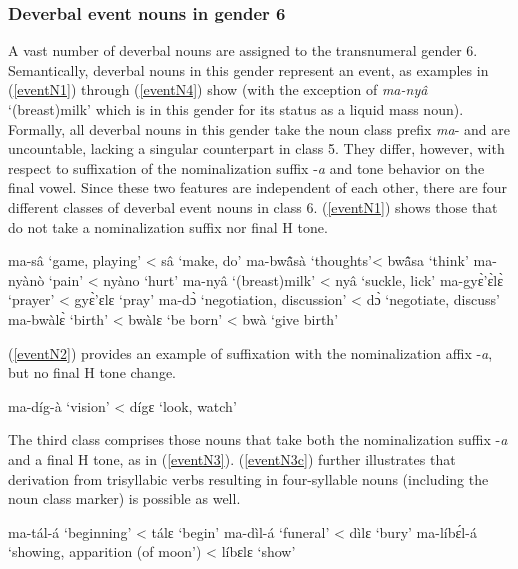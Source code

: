 \subsubsection{Deverbal event nouns in gender 6}
\label{sec:NOM6}

A vast number of deverbal nouns are assigned to the transnumeral gender 6. Semantically, deverbal nouns in this gender represent an event, as  examples in (\ref{eventN1}) through (\ref{eventN4}) show (with the exception of  {\itshape ma-nyâ} `(breast)milk' which is in this gender for its status as a liquid mass noun). 
Formally, all deverbal nouns in this gender take the noun class prefix {\itshape ma}- and are uncountable, lacking a singular counterpart in class 5.  They differ, however, with respect to suffixation of the nominalization suffix -{\itshape a} and tone behavior on the final vowel. Since these two features are independent of each other, there are four different classes of deverbal event nouns in class 6. (\ref{eventN1}) shows those that do not take a nominalization suffix nor final H tone.

\begin{exe}
\ex\label{eventN1}
\begin{xlist}
\ex ma-sâ `game, playing'  < sâ `make, do'
\ex ma-bwã̂sà `thoughts'< bwã̂sa `think'
\ex ma-nyànò `pain' < nyàno `hurt'
\ex ma-nyâ `(breast)milk' < nyâ `suckle, lick'
\ex ma-gyɛ̀'ɛ̀lɛ̀ `prayer' < gyɛ̀'ɛlɛ `pray'
\ex ma-dɔ̀ `negotiation, discussion' < dɔ̀ `negotiate, discuss'
\ex ma-bwàlɛ̀ `birth' < bwàlɛ `be born' < bwà `give birth'
\end{xlist}
\end{exe}

\noindent (\ref{eventN2}) provides an example of suffixation with the nominalization affix -{\itshape a}, but no final H tone change.

\begin{exe}
\ex\label{eventN2} ma-díg-à `vision' < dígɛ `look, watch'
\end{exe}

\noindent The third class comprises those nouns that take both the nominalization suffix -{\itshape a} and a final H tone, as in (\ref{eventN3}). (\ref{eventN3c}) further illustrates that derivation from trisyllabic verbs resulting in four-syllable nouns (including the noun class marker) is possible as well.

\begin{exe}
\ex\label{eventN3} 
\begin{xlist}
\ex ma-tál-á `beginning' < tálɛ `begin'
\ex ma-dìl-á `funeral' < dìlɛ `bury' 
\ex\label{eventN3c} ma-líbɛ́l-á `showing, apparition (of moon') < líbɛlɛ `show'
\end{xlist}
\end{exe}

